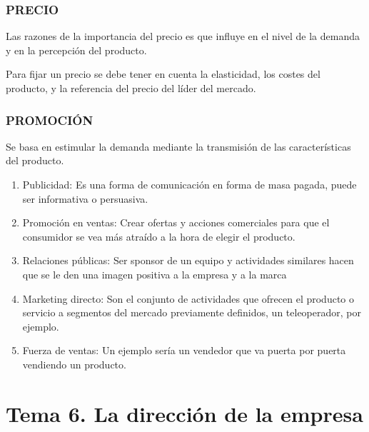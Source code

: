 \documentclass[12pt, twoside, openright]{report} %
\begin{document}
\subsection{PRECIO}
Las razones de la importancia del precio es que influye en el nivel de la demanda y en la percepción
del producto.

Para fijar un precio se debe tener en cuenta la elasticidad, los costes del producto, y la referencia del
precio del líder del mercado.
\subsection{PROMOCIÓN}
Se basa en estimular la demanda mediante la transmisión de las características del producto.
\begin{enumerate}
	\item Publicidad: Es una forma de comunicación en forma de masa pagada, puede ser informativa o
persuasiva.
	\item Promoción en ventas: Crear ofertas y acciones comerciales para que el consumidor se vea más
atraído a la hora de elegir el producto.
	\item Relaciones públicas: Ser sponsor de un equipo y actividades similares hacen que se le den una
imagen positiva a la empresa y a la marca
	\item Marketing directo: Son el conjunto de actividades que ofrecen el producto o servicio a
segmentos del mercado previamente definidos, un teleoperador, por ejemplo.
	\item Fuerza de ventas: Un ejemplo sería un vendedor que va puerta por puerta vendiendo un
producto.
\end{enumerate}



\chapter{Tema 6. La dirección de la empresa}
\end{document}
